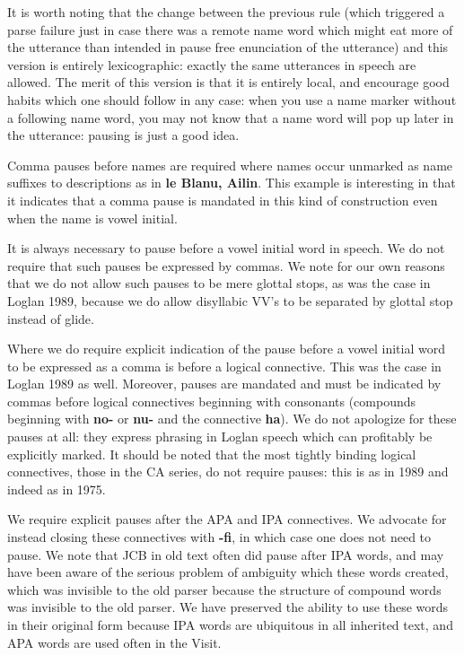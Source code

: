 \documentclass[12pt]{book}
\begin{document}
{It is worth noting that the change between the previous rule (which triggered a parse failure just in case there was a remote name word which might eat more of the utterance than intended in pause free enunciation of the utterance) and this version is entirely lexicographic:  exactly the same utterances in speech are allowed.  The merit of this version is that it is entirely local, and encourage good habits which one should follow in any case:  when you use a name marker without a following name word, you may not know that a name word will pop up later in the utterance:  pausing is just a good idea.

Comma pauses before names are required where names occur unmarked as name suffixes to descriptions as in {\bf le Blanu, Ailin}.  This example is interesting in that it indicates that a comma pause is mandated in this kind of construction even when the name is vowel initial.

It is always necessary to pause before a vowel initial word in speech.  We do not require that such pauses be expressed by commas.  We note for our own reasons that we do not allow such pauses to be mere glottal stops, as was the case in Loglan 1989, because we do allow disyllabic VV's to be separated by glottal stop instead of glide.

Where we do require explicit indication of the pause before a vowel initial word to be expressed as a comma is before a logical connective.  This was the case in Loglan 1989 as well.  Moreover, pauses are mandated and must be indicated by commas before logical connectives beginning with consonants (compounds beginning with {\bf no-} or {\bf nu-} and the connective {\bf ha}).  We do not apologize for these pauses at all:  they express phrasing in Loglan speech which can profitably be explicitly marked.  It should be noted that the most tightly binding logical connectives, those in the CA series, do not require pauses:  this is as in 1989 and indeed as in 1975.

We require explicit pauses after the APA and IPA connectives.  We advocate for instead closing these connectives with {\bf -fi}, in which case one does not need to pause.  We note that JCB in old text often did pause after IPA words, and may have been aware of the serious problem of ambiguity which these words created, which was invisible to the old parser because the structure of compound words was invisible to the old parser.  We have preserved the ability to use these words in their original form because IPA words are ubiquitous in all inherited text, and APA words are used often in the Visit.

}
\end{document}
